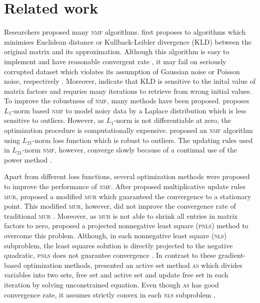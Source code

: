 \section{Related work}
Researchers proposed many \textsc{nmf} algorithms. \citet{lee2001algorithms} first proposes to algorithms which minimises Euclidean distance or Kullback-Leibler divergence (\textsc{KLD}) between the original matrix and its approximation. Although this algorithm is easy to implement and have reasonable convergent rate \citep{lee2001algorithms}, it may fail on seriously corrupted dataset which violates its assumption of Gaussian noise or Poisson noise, respectively \citep{guan2017truncated}. Moreover, \citet{yang2011kullback} indicate that \textsc{KLD} is sensitive to the inital value of matrix factors and requries many iterations to retrieve from wrong initial values.  To improve the robustness of \textsc{nmf}, many methods have been proposed. \citet{lam2008non} proposes ${L_1}$-norm based \textsc{nmf} to model noisy data by a Laplace distribution which is less sensitive to outliers. However, as $L_1$-norm is not differentiable at zero, the optimization procedure is computationally expensive. \citet{kong2011robust} proposed an \textsc{nmf} algorithm using $L_{21}$-norm loss function which is robust to outliers. The updating rules used in $L_{21}$-norm \textsc{nmf}, however, converge slowly because of a continual use of the power method \citep{guan2017truncated}.

Apart from different loss functions, several optimization methods were proposed to improve the performance of \textsc{nmf}. After \citet{lee2001algorithms} proposed  multiplicative update rules \textsc{mur}, \citet{ lin2007convergence} proposed a modified \textsc{mur} which guaranteed the convergence to a stationary point. This modified \textsc{mur}, however, did not improve the convergence rate of traditional \textsc{mur} \citep{guan2012nenmf}. Moreover, as \textsc{mur} is not able to shrink all entries in matrix factors to zero, \citet{berry2007algorithms} proposed a projected nonnegative least square (\textsc{pnls}) method to overcome this problem. Although, in each nonnegative least square (\textsc{nls}) subproblem, the least squares solution is directly projected to the negative quadratic, \textsc{pnls} does not guarantee convergence \citep{guan2012nenmf}. In contrast to these gradient-based optimization methods, \citet{kim2008nonnegative} presented an active set method \textsc{as} which divides variables into two sets, free set and active set and update free set in each iteration by solving unconstrained equation. Even though \textsc{as} has good convergence rate, it assumes strictly convex in each \textsc{nls} subproblem \citep{kim2008nonnegative}.
